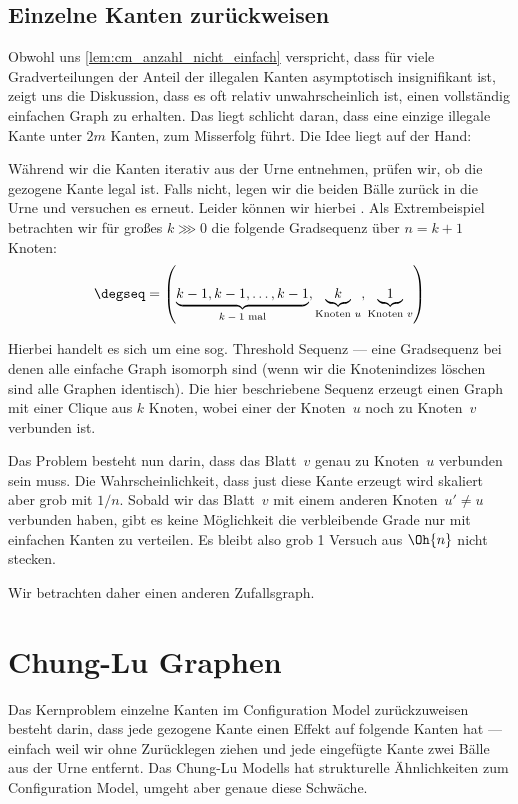 \subsection{Einzelne Kanten zurückweisen}
Obwohl uns \cref{lem:cm_anzahl_nicht_einfach} verspricht, dass für viele Gradverteilungen der Anteil der illegalen Kanten asymptotisch insignifikant ist, zeigt uns die Diskussion, dass es oft relativ unwahrscheinlich ist, einen vollständig einfachen Graph zu erhalten.
Das liegt schlicht daran, dass eine einzige illegale Kante unter $2m$ Kanten, zum Misserfolg führt.
Die Idee liegt auf der Hand:

Während wir die Kanten iterativ aus der Urne entnehmen, prüfen wir, ob die gezogene Kante legal ist.
Falls nicht, legen wir die beiden Bälle zurück in die Urne und versuchen es erneut.
Leider können wir hierbei .
Als Extrembeispiel betrachten wir für großes $k \ggg 0$ die folgende Gradsequenz über $n = k + 1$ Knoten:
\begin{align}
    \degseq = \left(
    \underbrace{k-1, k-1, \ldots, k-1}_\text{$k-1$ mal},
    \underbrace{k}_\text{Knoten $u$},
    \underbrace{1}_\text{Knoten $v$}
    \right)
\end{align}

Hierbei handelt es sich um eine sog. Threshold Sequenz --- eine Gradsequenz bei denen alle einfache Graph isomorph sind (\dh wenn wir die Knotenindizes löschen sind alle Graphen identisch).
Die hier beschriebene Sequenz erzeugt einen Graph mit einer Clique aus $k$ Knoten, wobei einer der Knoten~$u$ noch zu Knoten~$v$ verbunden ist.

Das Problem besteht nun darin, dass das Blatt~$v$ genau zu Knoten~$u$ verbunden sein muss.
Die Wahrscheinlichkeit, dass just diese Kante erzeugt wird skaliert aber grob mit $1/n$.
Sobald wir das Blatt~$v$ mit einem anderen Knoten~$u' \ne u$ verbunden haben, gibt es keine Möglichkeit die verbleibende Grade nur mit einfachen Kanten zu verteilen.
Es bleibt also grob 1 Versuch aus $\Oh{n}$ nicht stecken.

Wir betrachten daher einen anderen Zufallsgraph.

\section{Chung-Lu Graphen}
Das Kernproblem einzelne Kanten im Configuration Model zurückzuweisen besteht darin, dass jede gezogene Kante einen Effekt auf folgende Kanten hat ---
einfach weil wir ohne Zurücklegen ziehen und jede eingefügte Kante zwei Bälle aus der Urne entfernt.
Das Chung-Lu Modells hat strukturelle Ähnlichkeiten zum Configuration Model, umgeht aber genaue diese Schwäche.

